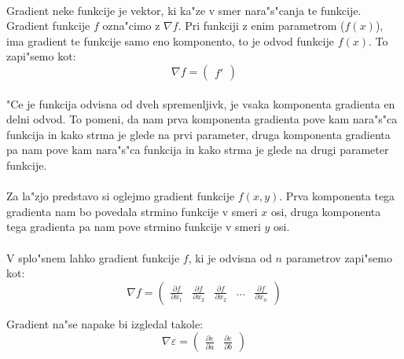 \paragraph{}
Gradient neke funkcije je vektor, ki ka"ze v smer nara"s"canja te funkcije. Gradient funkcije $f$ ozna"cimo z $\nabla f$. Pri funkciji z enim parametrom ($f(x)$), ima gradient te funkcije samo eno komponento, to je odvod funkcije $f(x)$. To zapi"semo kot:
\[\nabla f = \begin{pmatrix}f'\end{pmatrix} \]

\paragraph{}
"Ce je funkcija odvisna od dveh spremenljivk, je vsaka komponenta gradienta en delni odvod. To pomeni, da nam prva komponenta gradienta pove kam nara"s"ca funkcija in kako strma je glede na prvi parameter, druga komponenta gradienta pa nam pove kam nara"s"ca funkcija in kako strma je glede na drugi parameter funkcije.

\paragraph{}
Za la"zjo predstavo si oglejmo gradient funkcije $f(x,y)$. Prva komponenta tega gradienta nam bo povedala strmino funkcije v smeri $x$ osi, druga komponenta tega gradienta pa nam pove strmino funkcije v smeri $y$ osi.

\paragraph{}
V splo"snem lahko gradient funkcije $f$, ki je odvisna od $n$ parametrov zapi"semo kot:
\[\nabla f = \begin{pmatrix}
\frac{\partial f}{\partial x_1} &
\frac{\partial f}{\partial x_2} &
\frac{\partial f}{\partial x_2} &
\dots &
\frac{\partial f}{\partial x_n}
\end{pmatrix} \]

Gradient na"se napake bi izgledal takole:
\[\nabla \varepsilon = \begin{pmatrix}
\frac{\partial \varepsilon}{\partial a} &
\frac{\partial \varepsilon}{\partial b}
\end{pmatrix} \]